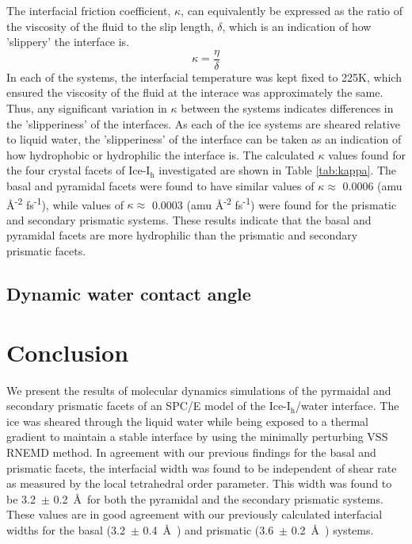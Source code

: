 \documentclass{pnastwo}
\begin{document}
\begin{article}
The interfacial friction coefficient, $\kappa$, can equivalently be expressed 
as the ratio of the viscosity of the fluid to the slip length, $\delta$, which
is an indication of how 'slippery' the interface is.
\begin{equation}\label{kappa-3}
\kappa = \frac{\eta}{\delta}
\end{equation} 
In each of the systems, the interfacial temperature was kept fixed to 225K, 
which ensured the viscosity of the fluid at the
interace was approximately the same. Thus, any significant variation in
$\kappa$ between
the systems indicates differences in the 'slipperiness' of the interfaces.
As each of the ice systems are sheared relative to liquid water, the
'slipperiness' of the interface can be taken as an indication of how
hydrophobic or hydrophilic the interface is. The calculated $\kappa$ values
found for the four crystal facets of Ice-I$_\mathrm{h}$ investigated are shown
in Table \ref{tab:kappa}. The basal and pyramidal facets were found to have 
similar values of $\kappa \approx$ 0.0006 
(amu \AA\textsuperscript{-2} fs\textsuperscript{-1}), while values of 
$\kappa \approx$ 0.0003 (amu \AA\textsuperscript{-2} fs\textsuperscript{-1})
were found for the prismatic and secondary prismatic systems.
These results indicate that the basal and pyramidal facets are
more hydrophilic than the prismatic and secondary prismatic facets.

\subsection{Dynamic water contact angle}
 



\section{Conclusion}
We present the results of molecular dynamics simulations of the pyrmaidal
and secondary prismatic facets of an SPC/E model of the 
Ice-I$_\mathrm{h}$/water interface. The ice was sheared through the liquid
water while being exposed to a thermal gradient to maintain a stable 
interface by using the minimally perturbing VSS RNEMD method. In agreement 
with our previous findings for the basal and prismatic facets, the interfacial 
width was found to be independent of shear rate as measured by the local 
tetrahedral order parameter. This width was found to be 
3.2~$\pm$ 0.2~\AA\ for both the pyramidal and the secondary prismatic systems.
These values are in good agreement with our previously calculated interfacial
widths for the basal (3.2~$\pm$ 0.4~\AA\ ) and prismatic (3.6~$\pm$ 0.2~\AA\ )
systems. 


\end{article}
\end{document}
